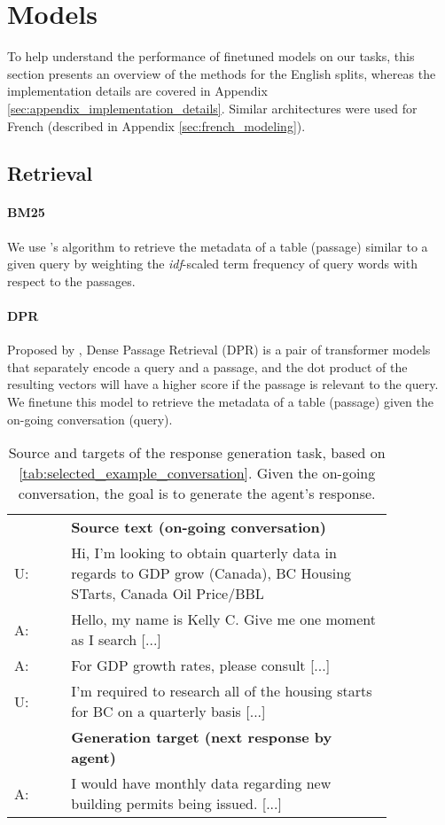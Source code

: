 \documentclass[11pt]{article}
\begin{document}
\section{Models}
\label{sec:models}

To help understand the performance of finetuned models on our tasks, this section presents an overview of the methods for the English splits, whereas the implementation details are covered in Appendix \ref{sec:appendix_implementation_details}. Similar architectures were used for French (described in Appendix \ref{sec:french_modeling}).


\subsection{Retrieval}

\paragraph{BM25} We use \citet{robertson_probabilistic_2009}'s algorithm to retrieve the metadata of a table (passage) similar to a given query by weighting the \textit{idf}-scaled term frequency of query words with respect to the passages. 

\paragraph{DPR} Proposed by \citet{karpukhin_dense_2020}, Dense Passage Retrieval (DPR) is a pair of transformer models that separately encode a query and a passage, and the dot product of the resulting vectors will have a higher score if the passage is relevant to the query. We finetune this model to retrieve the metadata of a table (passage) given the on-going conversation (query).

\begin{table}[t]
    \small
    \centering
    \begin{tabular}{l p{0.85\linewidth}}
    \toprule
        & \textbf{Source text (on-going conversation)} \\
    U:  & Hi, I'm looking to obtain quarterly data in regards to GDP grow (Canada), BC Housing STarts, Canada Oil Price/BBL\\
    A: & Hello, my name is Kelly C. Give me one moment as I search [...]\\
    A: & For GDP growth rates, please consult [...]\\
    U: & I'm required to research all of the housing starts for BC on a quarterly basis [...]\\
    \midrule
       & \textbf{Generation target (next response by agent)} \\
    A: & I would have monthly data regarding new building permits being issued. [...]\\
    \bottomrule
    \end{tabular}
    \caption{Source and targets of the response generation task, based on \autoref{tab:selected_example_conversation}. Given the on-going conversation, the goal is to generate the agent's response. \vspace{-2mm}
    }
    \label{tab:example_generation_task}
\end{table}
\end{document}
